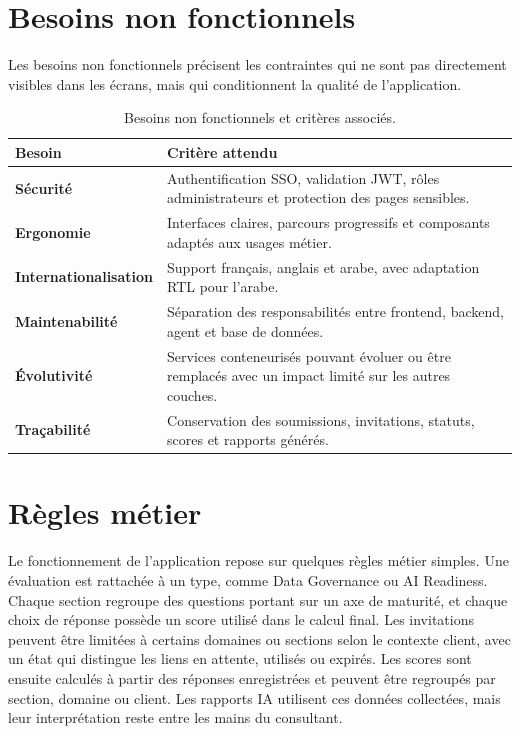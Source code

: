 \documentclass[12pt,a4paper]{report}
\begin{document}
\section{Besoins non fonctionnels}
Les besoins non fonctionnels précisent les contraintes qui ne sont pas directement visibles dans les écrans, mais qui conditionnent la qualité de l'application.

\begin{table}[H]
\centering
\caption{Besoins non fonctionnels et critères associés.}
\begin{tabularx}{\textwidth}{>{\bfseries}L{4cm}Y}
\toprule
Besoin & Critère attendu \\
\midrule
Sécurité & Authentification SSO, validation JWT, rôles administrateurs et protection des pages sensibles. \\
Ergonomie & Interfaces claires, parcours progressifs et composants adaptés aux usages métier. \\
Internationalisation & Support français, anglais et arabe, avec adaptation RTL pour l'arabe. \\
Maintenabilité & Séparation des responsabilités entre frontend, backend, agent et base de données. \\
Évolutivité & Services conteneurisés pouvant évoluer ou être remplacés avec un impact limité sur les autres couches. \\
Traçabilité & Conservation des soumissions, invitations, statuts, scores et rapports générés. \\
\bottomrule
\end{tabularx}
\end{table}

\section{Règles métier}
Le fonctionnement de l'application repose sur quelques règles métier simples. Une évaluation est rattachée à un type, comme Data Governance ou AI Readiness. Chaque section regroupe des questions portant sur un axe de maturité, et chaque choix de réponse possède un score utilisé dans le calcul final. Les invitations peuvent être limitées à certains domaines ou sections selon le contexte client, avec un état qui distingue les liens en attente, utilisés ou expirés. Les scores sont ensuite calculés à partir des réponses enregistrées et peuvent être regroupés par section, domaine ou client. Les rapports IA utilisent ces données collectées, mais leur interprétation reste entre les mains du consultant.
\end{document}
